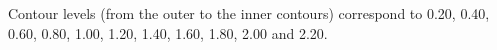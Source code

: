 Contour levels (from the outer to the inner contours) correspond to 0.20, 0.40, 0.60, 0.80, 1.00, 1.20, 1.40, 1.60, 1.80, 2.00 and 2.20.
